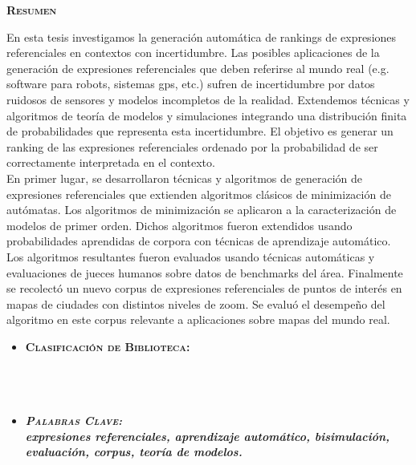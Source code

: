 \thispagestyle{empty}


\begin{center}

{ \vspace*{1cm} }
\huge{\textbf{\textsc{\textmd{Resumen}}}}\\[1cm]

\end{center}

\normalsize{


En esta tesis investigamos la generaci\'on autom\'atica de rankings de
expresiones referenciales en contextos con incertidumbre. Las
posibles aplicaciones de la generaci\'on de expresiones referenciales
que deben referirse al mundo real (e.g. software para robots, sistemas
gps, etc.) sufren de incertidumbre por datos ruidosos de sensores y
modelos incompletos de la realidad. Extendemos t\'ecnicas y algoritmos
de teor\'ia de modelos y simulaciones integrando una distribuci\'on finita
de probabilidades que representa esta incertidumbre. El objetivo es
generar un ranking de las expresiones referenciales ordenado por la
probabilidad de ser correctamente interpretada en el contexto. \\
En primer lugar, se desarrollaron t\'ecnicas y algoritmos de generaci\'on de
expresiones referenciales que extienden algoritmos cl\'asicos de
minimizaci\'on de aut\'omatas. Los algoritmos de minimizaci\'on se aplicaron a la caracterizaci\'on de modelos de
primer orden. Dichos algoritmos fueron extendidos usando
probabilidades aprendidas de corpora con t\'ecnicas de aprendizaje
autom\'atico. Los algoritmos resultantes fueron evaluados usando
t\'ecnicas autom\'aticas y evaluaciones de jueces humanos sobre datos de
benchmarks del \'area. Finalmente se recolect\'o un nuevo corpus de
expresiones referenciales de puntos de inter\'es en mapas de ciudades
con distintos niveles de zoom. Se evalu\'o el desempe\~no del algoritmo en
este corpus relevante a aplicaciones sobre mapas del mundo real.
}

\begin{itemize}
	\item \textbf{\textsc{Clasificaci\'on de Biblioteca:}} \\ \\  \\ \\

	\item \textbf{\emph{\textsc{Palabras Clave:} \\ expresiones referenciales, aprendizaje autom\'atico, bisimulaci\'on, evaluaci\'on, corpus, teor\'ia de modelos.}}
\end{itemize}

